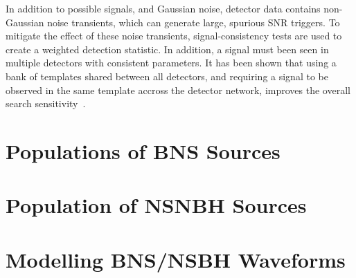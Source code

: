 In addition to possible signals, and Gaussian noise, detector data contains non-Gaussian noise transients, which can generate large, spurious SNR triggers. To mitigate the effect of these noise transients, signal-consistency tests are used to create a weighted detection statistic. In addition, a signal must been seen in multiple detectors with consistent parameters. It has been shown that using a bank of templates shared between all detectors, and requiring a signal to be observed in the same template accross the detector network, improves the overall search sensitivity~\cite{samantha}. 

\section{Populations of BNS Sources}

\section{Population of NSNBH Sources}

\section{Modelling BNS/NSBH Waveforms}
